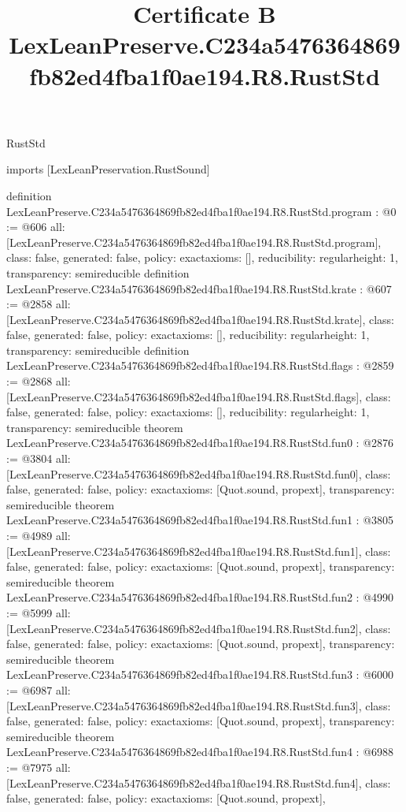 \begin{lexlean}{RustStd}
\title{Certificate B LexLeanPreserve.C234a5476364869fb82ed4fba1f0ae194.R8.RustStd}
\begin{coremodule}
imports [LexLeanPreservation.RustSound]

definition LexLeanPreserve.C234a5476364869fb82ed4fba1f0ae194.R8.RustStd.program : @0 := @606 {
  all: [LexLeanPreserve.C234a5476364869fb82ed4fba1f0ae194.R8.RustStd.program],
  class: false,
  generated: false,
  policy: exact{axioms: []},
  reducibility: regular{height: 1},
  transparency: semireducible
}
definition LexLeanPreserve.C234a5476364869fb82ed4fba1f0ae194.R8.RustStd.krate : @607 := @2858 {
  all: [LexLeanPreserve.C234a5476364869fb82ed4fba1f0ae194.R8.RustStd.krate],
  class: false,
  generated: false,
  policy: exact{axioms: []},
  reducibility: regular{height: 1},
  transparency: semireducible
}
definition LexLeanPreserve.C234a5476364869fb82ed4fba1f0ae194.R8.RustStd.flags : @2859 := @2868 {
  all: [LexLeanPreserve.C234a5476364869fb82ed4fba1f0ae194.R8.RustStd.flags],
  class: false,
  generated: false,
  policy: exact{axioms: []},
  reducibility: regular{height: 1},
  transparency: semireducible
}
theorem LexLeanPreserve.C234a5476364869fb82ed4fba1f0ae194.R8.RustStd.fun0 : @2876 := @3804 {
  all: [LexLeanPreserve.C234a5476364869fb82ed4fba1f0ae194.R8.RustStd.fun0],
  class: false,
  generated: false,
  policy: exact{axioms: [Quot.sound, propext]},
  transparency: semireducible
}
theorem LexLeanPreserve.C234a5476364869fb82ed4fba1f0ae194.R8.RustStd.fun1 : @3805 := @4989 {
  all: [LexLeanPreserve.C234a5476364869fb82ed4fba1f0ae194.R8.RustStd.fun1],
  class: false,
  generated: false,
  policy: exact{axioms: [Quot.sound, propext]},
  transparency: semireducible
}
theorem LexLeanPreserve.C234a5476364869fb82ed4fba1f0ae194.R8.RustStd.fun2 : @4990 := @5999 {
  all: [LexLeanPreserve.C234a5476364869fb82ed4fba1f0ae194.R8.RustStd.fun2],
  class: false,
  generated: false,
  policy: exact{axioms: [Quot.sound, propext]},
  transparency: semireducible
}
theorem LexLeanPreserve.C234a5476364869fb82ed4fba1f0ae194.R8.RustStd.fun3 : @6000 := @6987 {
  all: [LexLeanPreserve.C234a5476364869fb82ed4fba1f0ae194.R8.RustStd.fun3],
  class: false,
  generated: false,
  policy: exact{axioms: [Quot.sound, propext]},
  transparency: semireducible
}
theorem LexLeanPreserve.C234a5476364869fb82ed4fba1f0ae194.R8.RustStd.fun4 : @6988 := @7975 {
  all: [LexLeanPreserve.C234a5476364869fb82ed4fba1f0ae194.R8.RustStd.fun4],
  class: false,
  generated: false,
  policy: exact{axioms: [Quot.sound, propext]},
}
\end{coremodule}
\end{lexlean}
